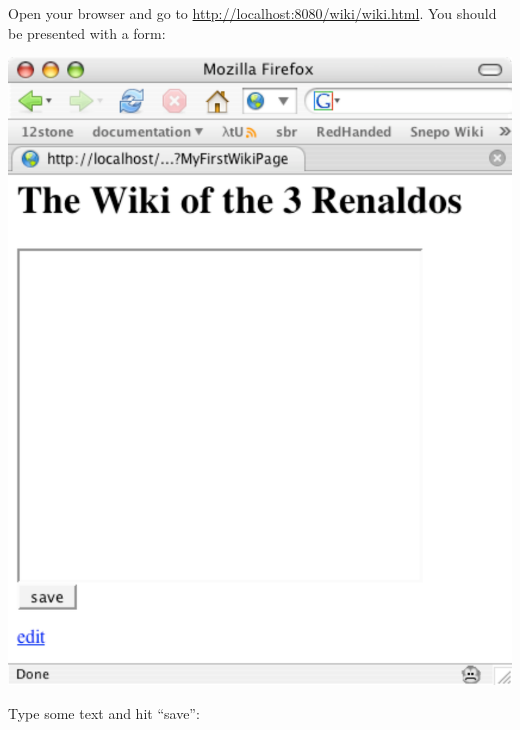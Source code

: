 \documentclass{report}
\begin{document}
Open your browser and go to
\url{http://localhost:8080/wiki/wiki.html}. You should be
presented with a form:

\begin{center}
\includegraphics[scale=0.70]{wiki-tutorial-images/wiki-screenshot-1.pdf}
\end{center}
Type some text and hit ``save'': 
\end{document}
